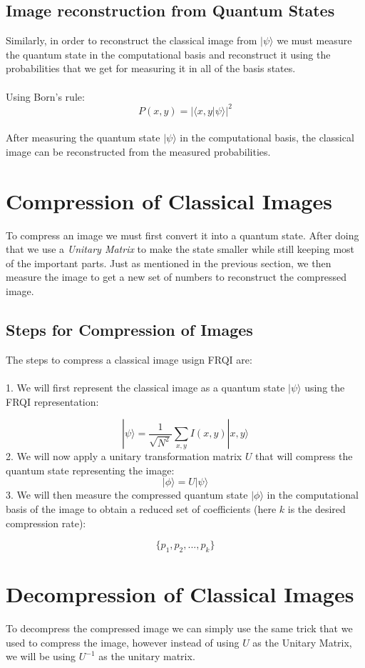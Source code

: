 \documentclass[letterpaper, 12pt]{article}
\begin{document}
\subsection{Image reconstruction from Quantum States}
Similarly, in order to reconstruct the classical image from $|\psi\rangle$ we must measure the quantum state in the computational basis and reconstruct it using the probabilities that we get for measuring it in all of the basis states.\\\\
Using Born's rule:
$$
P(x,y) = |\langle x,y|\psi\rangle|^2
$$\\
After measuring the quantum state $|\psi\rangle$ in the computational basis, the classical image can be reconstructed from the measured probabilities.\\

\section{Compression of Classical Images}
To compress an image we must first convert it into a quantum state. After doing that we use a \textit{Unitary Matrix} to make the state smaller while still keeping most of the important parts. Just as mentioned in the previous section, we then measure the image to get a new set of numbers to reconstruct the compressed image. 

\subsection{Steps for Compression of Images}
The steps to compress a classical image usign FRQI are:\\\\
1. We will first represent the classical image as a quantum state $|\psi\rangle$ using the FRQI representation:

$$
|\psi\rangle = \frac{1}{\sqrt{N^2}} \sum_{x,y} I(x,y) |x,y\rangle
$$
2. We will now apply a unitary transformation matrix $U$ that will compress the quantum state representing the image:
$$
|\phi\rangle = U|\psi\rangle
$$
3. We will then measure the compressed quantum state $|\phi\rangle$ in the computational basis of the image to obtain a reduced set of coefficients (here $k$ is the desired compression rate):

$$
\{p_1, p_2, ..., p_k\}
$$

\section{Decompression of Classical Images}
To decompress the compressed image we can simply use the same trick that we used to compress the image, however instead of using $U$ as the Unitary Matrix, we will be using $U^{-1}$ as the unitary matrix. 
\end{document}
